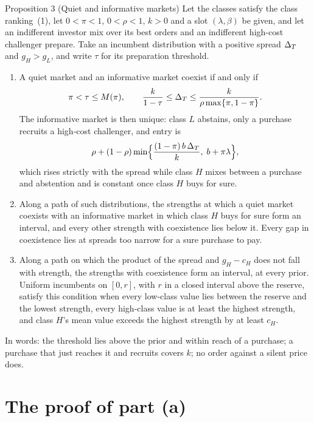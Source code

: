 \begin{paperresult}{Proposition 3 (Quiet and informative markets)}
Let the classes satisfy the class ranking~(1), let \(0<\pi<1\), \(0<\rho<1\), \(k>0\) and a slot \((\lambda,\beta)\)
be given, and let an indifferent investor mix over its best orders and an indifferent high-cost challenger prepare.
Take an incumbent distribution with a positive spread \(\Delta_T\) and \(g_H>g_L\), and write \(\tau\) for its preparation
threshold.
\begin{enumerate}[label=(\alph*),leftmargin=2em]
\item A quiet market and an informative market coexist if and only if
\[
\pi<\tau\le M(\pi),\qquad \frac{k}{1-\tau}\le\Delta_T\le\frac{k}{\rho\max\{\pi,1-\pi\}}.
\]
The informative market is then unique: class \(L\) abstains, only a purchase recruits a high-cost challenger, and
entry is
\[
\rho+(1-\rho)\min\Bigl\{\frac{(1-\pi)\,b\,\Delta_T}{k},\;b+\pi\lambda\Bigr\},
\]
which rises strictly with the spread while class \(H\) mixes between a purchase and abstention and is constant once
class \(H\) buys for sure.
\item Along a path of such distributions, the strengths at which a quiet market coexists with an informative market
in which class \(H\) buys for sure form an interval, and every other strength with coexistence lies below it. Every
gap in coexistence lies at spreads too narrow for a sure purchase to pay.
\item Along a path on which the product of the spread and \(g_H-c_H\) does not fall with strength, the strengths
with coexistence form an interval, at every prior. Uniform incumbents on \([0,r]\), with \(r\) in a closed interval
above the reserve, satisfy this condition when every low-class value lies between the reserve and the lowest
strength, every high-class value is at least the highest strength, and class \(H\)'s mean value exceeds the highest
strength by at least \(c_H\).
\end{enumerate}
\end{paperresult}

In words: the threshold lies above the prior and within reach of a purchase; a purchase that just reaches it and
recruits covers \(k\); no order against a silent price does.

\section{The proof of part (a)}\label{sec:coexistence-proof-a}

